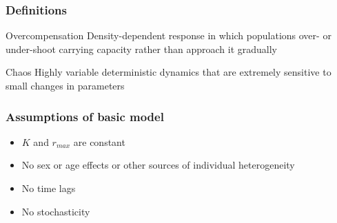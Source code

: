 \documentclass[color=usenames,dvipsnames]{beamer}\usepackage[]{graphicx}\usepackage[]{color}
\begin{document}
\begin{frame}
  \frametitle{Definitions}
  \begin{block}{Overcompensation}
    Density-dependent response in which populations over- or
    under-shoot carrying capacity rather than approach it gradually
  \end{block}
  \pause
  \begin{block}{Chaos}
    Highly variable deterministic dynamics that are extremely
    sensitive to small changes in parameters
  \end{block}
\end{frame}






%






\begin{frame}
  \frametitle{Assumptions of basic model}
  \Large
  \begin{itemize}
    \item $K$ and $r_{max}$ are constant
    \item No sex or age effects or other sources of individual heterogeneity
    \item No time lags
    \item No stochasticity
  \end{itemize}
\end{frame}
\end{document}
